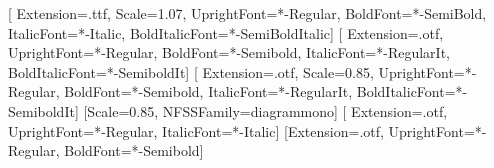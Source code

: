 
\usepackage[paperwidth=504bp, paperheight=661.5bp,
            textwidth=378bp, inner=63bp, top=66bp, textheight=523bp,
            headheight=12bp, headsep=23bp, footskip=34bp]{geometry}

\usepackage{fix-cm}   %
\usepackage{fontspec}
\setmainfont{CrimsonPro}[
  Extension=.ttf, Scale=1.07,
  UprightFont=*-Regular, BoldFont=*-SemiBold,
  ItalicFont=*-Italic,   BoldItalicFont=*-SemiBoldItalic]
\setsansfont{SourceSans3}[
  Extension=.otf,
  UprightFont=*-Regular,  BoldFont=*-Semibold,
  ItalicFont=*-RegularIt, BoldItalicFont=*-SemiboldIt]
\setmonofont{SourceCodePro}[
  Extension=.otf, Scale=0.85,
  UprightFont=*-Regular,  BoldFont=*-Semibold,
  ItalicFont=*-RegularIt, BoldItalicFont=*-SemiboldIt]
\newfontfamily{}[Scale=0.85, NFSSFamily=diagrammono]
\newfontfamily{}[
  Extension=.otf, UprightFont=*-Regular, ItalicFont=*-Italic]
\newfontfamily{}[Extension=.otf, UprightFont=*-Regular, BoldFont=*-Semibold]
\newfontfamily{}


